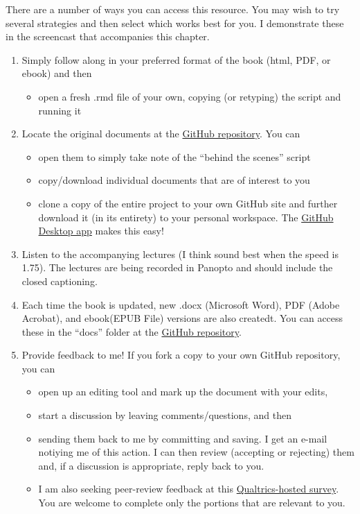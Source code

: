 \documentclass[
  11pt,
]{book}
\providecommand{\tightlist}{%
  \setlength{\itemsep}{0pt}\setlength{\parskip}{0pt}}
\begin{document}
There are a number of ways you can access this resource. You may wish to try several strategies and then select which works best for you. I demonstrate these in the screencast that accompanies this chapter.

\begin{enumerate}
\def\labelenumi{\arabic{enumi}.}
\item
  Simply follow along in your preferred format of the book (html, PDF, or ebook) and then

  \begin{itemize}
  \tightlist
  \item
    open a fresh .rmd file of your own, copying (or retyping) the script and running it
  \end{itemize}
\item
  Locate the original documents at the \href{https://github.com/lhbikos/ReCenterPsychStats}{GitHub repository}. You can

  \begin{itemize}
  \tightlist
  \item
    open them to simply take note of the ``behind the scenes'' script
  \item
    copy/download individual documents that are of interest to you
  \item
    clone a copy of the entire project to your own GitHub site and further download it (in its entirety) to your personal workspace. The \href{https://desktop.github.com/}{GitHub Desktop app} makes this easy!
  \end{itemize}
\item
  Listen to the accompanying lectures (I think sound best when the speed is 1.75). The lectures are being recorded in Panopto and should include the closed captioning.
\item
  Each time the book is updated, new .docx (Microsoft Word), PDF (Adobe Acrobat), and ebook(EPUB File) versions are also createdt. You can access these in the ``docs'' folder at the \href{https://github.com/lhbikos/ReCenterPsychStats}{GitHub repository}.
\item
  Provide feedback to me! If you fork a copy to your own GitHub repository, you can

  \begin{itemize}
  \tightlist
  \item
    open up an editing tool and mark up the document with your edits,
  \item
    start a discussion by leaving comments/questions, and then
  \item
    sending them back to me by committing and saving. I get an e-mail notiying me of this action. I can then review (accepting or rejecting) them and, if a discussion is appropriate, reply back to you.
  \item
    I am also seeking peer-review feedback at this \href{https://spupsych.az1.qualtrics.com/jfe/form/SV_0OnBLfut3VIOIS2}{Qualtrics-hosted survey}. You are welcome to complete only the portions that are relevant to you.
  \end{itemize}
\end{enumerate}
\end{document}

